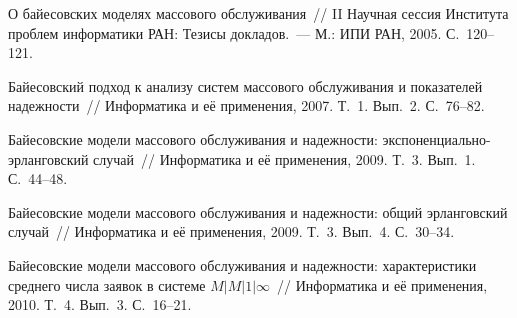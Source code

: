 \begin{multicols}{2}
{{\begin{thebibliography}{99}
О байесовских моделях массового обслуживания~//
II Научная сессия Института проблем информатики РАН: Тезисы докладов.~--- М.: ИПИ РАН, 2005. С.~120--121.

 Байесовский подход к
анализу систем массового обслуживания и показателей надежности~//
Информатика и её применения, 2007. Т.~1. Вып.~2. С.~76--82.

 Байесовские модели
массового обслуживания и надежности: экспо\-нен\-ци\-аль\-но-эрлан\-гов\-ский
случай~// Информатика и её применения, 2009. Т.~3. Вып.~1. С.~44--48.

 Байесовские
модели массового обслуживания и надежности: общий эрланговский
случай~// Информатика и её применения, 2009. Т.~3. Вып.~4. С.~30--34.

\label{end\stat}

 Байесовские модели
массового обслуживания и надежности: характеристики среднего числа
заявок в системе $M|M|1|\infty$~// Информатика и её применения, 2010.
Т.~4. Вып.~3. С.~16--21.
\end{thebibliography}
}
}

\end{multicols}